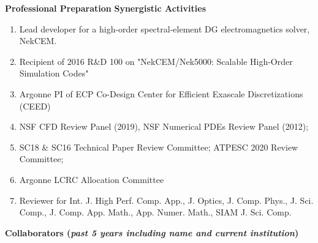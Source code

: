 \documentclass[11pt,letterpaper,english]{article}
\begin{document}
\begin{flushleft} {\bf Professional Preparation}
\vspace{.04in}
{\bf Synergistic Activities}
\vspace{-6pt}
\begin{enumerate} \itemsep1pt \parskip0pt 
\item Lead developer for a high-order spectral-element DG electromagnetics solver, NekCEM.
\item Recipient of 2016 R\&D 100 on "NekCEM/Nek5000: Scalable High-Order Simulation Codes"
\item Argonne PI of ECP Co-Design Center for Efficient Exascale Discretizations (CEED)
\item NSF CFD Review Panel (2019), NSF Numerical PDEs Review Panel (2012);
\item SC18 \& SC16 Technical Paper Review Committee;  ATPESC 2020 Review Committee;
\item Argonne LCRC Allocation Committee
\item Reviewer for Int. J. High Perf. Comp. App.,
J. Optics, J. Comp. Phys.,
J. Sci. Comp., J. Comp. App. Math., App. Numer. Math., SIAM J. Sci. Comp.
\end{enumerate}

\vspace{-6pt}
{\bf Collaborators ({\emph{past 5 years including name and current institution}})}
{\parindent 16pt

}
\end{flushleft}
\end{document}
